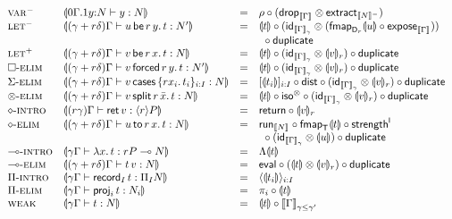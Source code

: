 \documentclass[acmsmall,review,anonymous]{acmart}\settopmatter{printfolios=true,printccs=false,printacmref=false}
\begin{document}
\[
\begin{array}{llcl}
\rvar^-
  & \dent {\oCompTy{\qext 0 \Gamma 1 y N} y N}
  & = & \Gr \comp (\tdrop[\den\Gamma] \otimes \extract[\denn N])
\\
\rlet^{-}
  & \dent {\pCompTy {\gamma + r\delta} \Gamma {\qlet r y u t} {N'}}
  & = & \dent t
  \comp (\tid[\Den \Gamma \gamma] \otimes
           (\fmapt[{\D[r]}] \dent u \comp \expose[\den \Gamma]))
\\ &&& {~}
  \comp \duplicate
\\
\rlet^{+}
  & \dent {\pCompTy {\gamma + r\delta} \Gamma {\qlet r x v t} {N}}
  & = & \dent t
  \comp (\tid[\Den \Gamma \gamma] \otimes \denv v r)
  \comp \duplicate
\\
\relim\Box
  & \dent {\pCompTy {\gamma + r\delta} \Gamma {\qforced r v y t} {N'}}
  & = & \dent t
  \comp (\tid[\Den \Gamma \gamma] \otimes \denv v r)
  \comp \duplicate
\\
\relim\GS
  & \dent {\pCompTy {\gamma + r\delta} \Gamma {\caser v \{r x_i.\, t_i\}_{i:I}} {N}}
  & = & [\dent {t_i}]_{i:I} \comp \tdist
  \comp (\tid[\Den \Gamma \gamma] \otimes \denv v r)
  \comp \duplicate
\\
\relim\otimes
  & \dent {\pCompTy {\gamma + r\delta} \Gamma {\qsplits r v {\bar x} t} {N}}
  & = & \dent t \comp \isot
  \comp (\tid[\Den \Gamma \gamma] \otimes \denv v r)
  \comp \duplicate
\\
\rintro\diamond
  & \dent {\pCompTy {r\gamma} \Gamma {\ret v} {\compty r P}}
  & = & \treturn \comp \denv v r
\\
\relim\diamond
  & \dent {\pCompTy {\gamma + r\delta} \Gamma {\qbind r x u t} {N}}
  & = & \run[\den N] \comp \fmapt[\T]{\dent t} \comp \strengthl
\\ &&& {~}
  \comp (\tid[\Den \Gamma \gamma] \otimes \dent u)
  \comp \duplicate
\\
\rintro\lolli
  & \dent {\qCompTy \gamma \Gamma {\lam x t} {\qfun r P N}}
  & = & \Lambda \dent t
\\
\relim\lolli
  & \dent{\pCompTy {\gamma + r\delta} \Gamma {\app t v} N}
  & = & \teval \comp (\dent t \otimes \denv v r) \comp \duplicate
\\
\rintro\Pi
  & \dent {\qCompTy \gamma \Gamma {\recrd I t} {\rect I N}}
  & = & \langle \dent {t_i} \rangle_{i:I}
\\
\relim\Pi
  & \dent {\qCompTy \gamma \Gamma {\proj i t} {N_i}}
  & = & \pi_i \comp \dent t
\\
\rweak
  & \dent {\qCompTy \gamma \Gamma t N}
  & = & \dent t \comp \Den \Gamma {\gamma \leq \gamma'}
\\
\end{array}
\]
\end{document}

